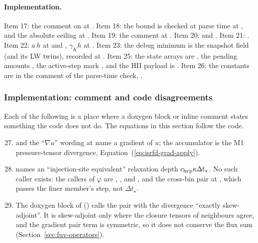 \paragraph{Implementation.} Item 17: the comment on  at
. Item 18: the bound is checked at parse time at
, and the absolute ceiling at
. Item 19: the comment at
. Item 20:  and
. Item 21: . Item 22:
$a\,h$ at  and , $\gamma_K h$ at
. Item 23: the debug minimum is the snapshot field
 (and its LW twins), recorded at
. Item 25: the state arrays are
, the pending amounts
, the active-step mark
, and the HII payload is
. Item 26: the constants are in the comment
of the parse-time check, .

\subsubsection{Implementation: comment and code disagreements}

Each of the following is a place where a doxygen block or inline comment states
something the code does not do. The equations in this section follow the code.

\begin{enumerate}
  \setcounter{enumi}{26}
  \item {} and the ``$\nabla u$'' wording at
     name a gradient of $u$; the accumulator is the
    M1 pressure-tensor divergence, Equation~(\ref{eq:isrfd-grad-apply}).
  \item {} names an ``injection-site equivalent''
    relaxation depth $c_{\rm hyp}\kappa\Delta t_\star$. No such caller exists:
    the callers of $\varphi$ are , ,
     and , and the cross-bin pair at
    , which passes the finer member's
    step, not $\Delta t_\star$.
  \item The doxygen block of 
    () calls the pair with the
    divergence ``exactly skew-adjoint''. It is skew-adjoint only where the
    closure tensors of neighbours agree, and the gradient pair term is
    symmetric, so it does not conserve the flux sum
    (Section~\ref{sec:fuv-operators}).
\end{enumerate}

